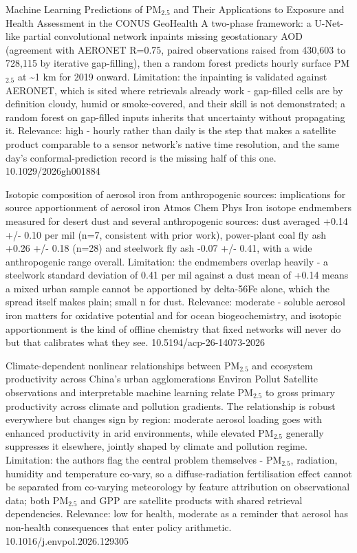 \documentclass[10pt]{article}
\begin{document}
{Machine Learning Predictions of PM$_{2.5}$ and Their Applications to Exposure and Health Assessment in the CONUS}
{GeoHealth}
{A two-phase framework: a U-Net-like partial convolutional network inpaints missing geostationary AOD (agreement with AERONET R=0.75, paired observations raised from 430,603 to 728,115 by iterative gap-filling), then a random forest predicts hourly surface PM$_{2.5}$ at \textasciitilde{}1 km for 2019 onward. Limitation: the inpainting is validated against AERONET, which is sited where retrievals already work - gap-filled cells are by definition cloudy, humid or smoke-covered, and their skill is not demonstrated; a random forest on gap-filled inputs inherits that uncertainty without propagating it. Relevance: high - hourly rather than daily is the step that makes a satellite product comparable to a sensor network's native time resolution, and the same day's conformal-prediction record is the missing half of this one.}
{10.1029/2026gh001884}

{Isotopic composition of aerosol iron from anthropogenic sources: implications for source apportionment of aerosol iron}
{Atmos Chem Phys}
{Iron isotope endmembers measured for desert dust and several anthropogenic sources: dust averaged +0.14 +/- 0.10 per mil (n=7, consistent with prior work), power-plant coal fly ash +0.26 +/- 0.18 (n=28) and steelwork fly ash -0.07 +/- 0.41, with a wide anthropogenic range overall. Limitation: the endmembers overlap heavily - a steelwork standard deviation of 0.41 per mil against a dust mean of +0.14 means a mixed urban sample cannot be apportioned by delta-56Fe alone, which the spread itself makes plain; small n for dust. Relevance: moderate - soluble aerosol iron matters for oxidative potential and for ocean biogeochemistry, and isotopic apportionment is the kind of offline chemistry that fixed networks will never do but that calibrates what they see.}
{10.5194/acp-26-14073-2026}

{Climate-dependent nonlinear relationships between PM$_{2.5}$ and ecosystem productivity across China's urban agglomerations}
{Environ Pollut}
{Satellite observations and interpretable machine learning relate PM$_{2.5}$ to gross primary productivity across climate and pollution gradients. The relationship is robust everywhere but changes sign by region: moderate aerosol loading goes with enhanced productivity in arid environments, while elevated PM$_{2.5}$ generally suppresses it elsewhere, jointly shaped by climate and pollution regime. Limitation: the authors flag the central problem themselves - PM$_{2.5}$, radiation, humidity and temperature co-vary, so a diffuse-radiation fertilisation effect cannot be separated from co-varying meteorology by feature attribution on observational data; both PM$_{2.5}$ and GPP are satellite products with shared retrieval dependencies. Relevance: low for health, moderate as a reminder that aerosol has non-health consequences that enter policy arithmetic.}
{10.1016/j.envpol.2026.129305}
\end{document}
